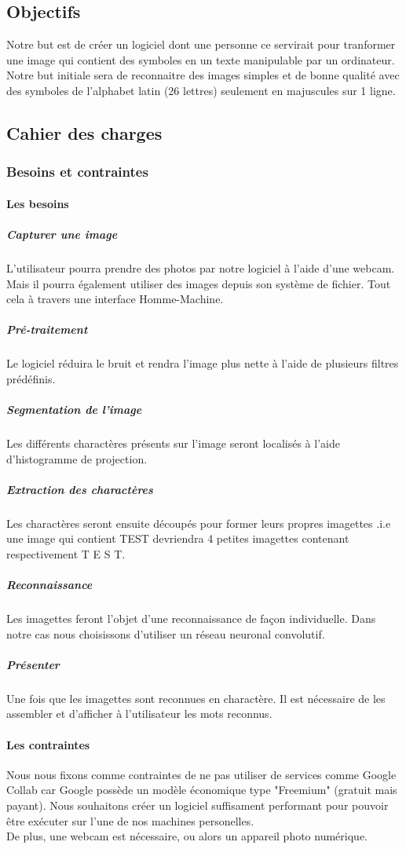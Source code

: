 \documentclass[a4paper]{article}
\begin{document}
		\subsection{Objectifs}
			Notre but est de créer un logiciel dont une personne ce servirait pour tranformer une image qui contient des symboles en un texte manipulable par un ordinateur.\\
			Notre but initiale sera de reconnaitre des images simples et de bonne qualité avec des symboles de l'alphabet latin (26 lettres) seulement en majuscules sur 1 ligne.
		\subsection{Cahier des charges}
			\subsubsection{Besoins et contraintes}
				\paragraph{Les besoins}
					\subparagraph{Capturer une image}
						L'utilisateur pourra prendre des photos par notre logiciel à l'aide d'une webcam. Mais il pourra également utiliser des images depuis son système de fichier. Tout cela à travers une interface Homme-Machine.
					\subparagraph{Pré-traitement}
						Le logiciel réduira le bruit et rendra l'image plus nette à l'aide de plusieurs filtres prédéfinis. 
					\subparagraph{Segmentation de l'image}
						Les différents charactères présents sur l'image seront localisés à l'aide d'histogramme de projection.
					\subparagraph{Extraction des charactères}
						Les charactères seront ensuite découpés pour former leurs propres imagettes .i.e une image qui contient TEST devriendra 4 petites imagettes contenant respectivement T E S T.
					\subparagraph{Reconnaissance}
						Les imagettes feront l'objet d'une reconnaissance de façon individuelle. Dans notre cas nous choisissons d'utiliser un réseau neuronal convolutif.
					\subparagraph{Présenter}
						Une fois que les imagettes sont reconnues en charactère. Il est nécessaire de les assembler et d'afficher à l'utilisateur les mots reconnus.
				\paragraph{Les contraintes}
					Nous nous fixons comme contraintes de ne pas utiliser de services comme Google Collab car Google possède un modèle économique type "Freemium" (gratuit mais payant). Nous souhaitons créer un logiciel suffisament performant pour pouvoir être exécuter sur l'une de nos machines personelles. \\De plus, une webcam est nécessaire, ou alors un appareil photo numérique.
\end{document}

